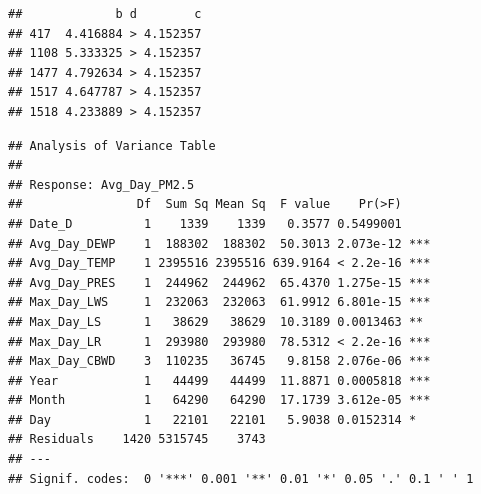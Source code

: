 \documentclass[
]{article}
\begin{document}
\begin{verbatim}
##             b d        c
## 417  4.416884 > 4.152357
## 1108 5.333325 > 4.152357
## 1477 4.792634 > 4.152357
## 1517 4.647787 > 4.152357
## 1518 4.233889 > 4.152357
\end{verbatim}

\begin{verbatim}
## Analysis of Variance Table
## 
## Response: Avg_Day_PM2.5
##                Df  Sum Sq Mean Sq  F value    Pr(>F)    
## Date_D          1    1339    1339   0.3577 0.5499001    
## Avg_Day_DEWP    1  188302  188302  50.3013 2.073e-12 ***
## Avg_Day_TEMP    1 2395516 2395516 639.9164 < 2.2e-16 ***
## Avg_Day_PRES    1  244962  244962  65.4370 1.275e-15 ***
## Max_Day_LWS     1  232063  232063  61.9912 6.801e-15 ***
## Max_Day_LS      1   38629   38629  10.3189 0.0013463 ** 
## Max_Day_LR      1  293980  293980  78.5312 < 2.2e-16 ***
## Max_Day_CBWD    3  110235   36745   9.8158 2.076e-06 ***
## Year            1   44499   44499  11.8871 0.0005818 ***
## Month           1   64290   64290  17.1739 3.612e-05 ***
## Day             1   22101   22101   5.9038 0.0152314 *  
## Residuals    1420 5315745    3743                       
## ---
## Signif. codes:  0 '***' 0.001 '**' 0.01 '*' 0.05 '.' 0.1 ' ' 1
\end{verbatim}
\end{document}

